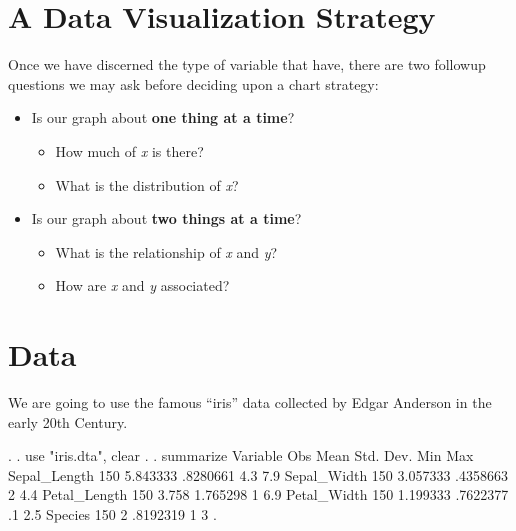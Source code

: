 \documentclass[]{article}
\providecommand{\tightlist}{%
  \setlength{\itemsep}{0pt}\setlength{\parskip}{0pt}}
\begin{document}
\hypertarget{a-data-visualization-strategy}{%
\section{A Data Visualization
Strategy}\label{a-data-visualization-strategy}}

Once we have discerned the type of variable that have, there are two
followup questions we may ask before deciding upon a chart strategy:

\begin{itemize}
\tightlist
\item
  Is our graph about \textbf{one thing at a time}?

  \begin{itemize}
  \tightlist
  \item
    How much of \emph{x} is there?
  \item
    What is the distribution of \emph{x}?
  \end{itemize}
\item
  Is our graph about \textbf{two things at a time}?

  \begin{itemize}
  \tightlist
  \item
    What is the relationship of \emph{x} and \emph{y}?
  \item
    How are \emph{x} and \emph{y} associated?
  \end{itemize}
\end{itemize}

\hypertarget{data}{%
\section{Data}\label{data}}

We are going to use the famous ``iris'' data collected by Edgar Anderson
in the early 20th Century.

\begin{stlog}
. 
. use "iris.dta", clear
{\smallskip}
. 
. summarize
{\smallskip}
    Variable {\VBAR}        Obs        Mean    Std. Dev.       Min        Max
Sepal_Length {\VBAR}        150    5.843333    .8280661        4.3        7.9
 Sepal_Width {\VBAR}        150    3.057333    .4358663          2        4.4
Petal_Length {\VBAR}        150       3.758    1.765298          1        6.9
 Petal_Width {\VBAR}        150    1.199333    .7622377         .1        2.5
     Species {\VBAR}        150           2    .8192319          1          3
{\smallskip}
. 
\end{stlog}
\end{document}
